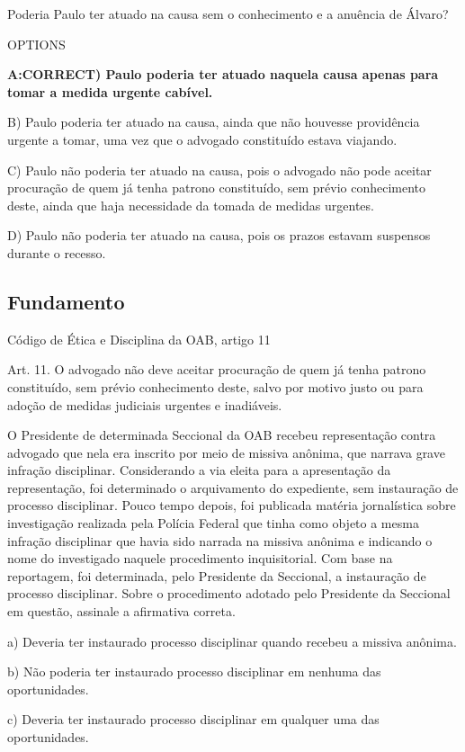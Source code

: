 \documentclass[12pt]{article}
\begin{document}
Poderia Paulo ter atuado na causa sem o conhecimento e a 
anuência de Álvaro? 

OPTIONS

\textbf{A:CORRECT) Paulo poderia ter atuado naquela causa apenas para tomar 
a medida urgente cabível.} 

B) Paulo poderia ter atuado na causa, ainda que não 
houvesse providência urgente a tomar, uma vez que o 
advogado constituído estava viajando. 

C) Paulo não poderia ter atuado na causa, pois o advogado 
não pode aceitar procuração de quem já tenha patrono 
constituído, sem prévio conhecimento deste, ainda que 
haja necessidade da tomada de medidas urgentes. 

D) Paulo não poderia ter atuado na causa, pois os prazos 
estavam suspensos durante o recesso. 

\subsection{Fundamento}

Código de Ética e Disciplina da OAB, artigo 11

Art. 11. O advogado não deve aceitar procuração de quem já tenha patrono constituído, sem prévio conhecimento deste, salvo por motivo justo ou para adoção de medidas
judiciais urgentes e inadiáveis.

O Presidente de determinada Seccional da OAB recebeu representação contra advogado que nela era inscrito por meio de missiva anônima, que narrava grave infração disciplinar. Considerando a via eleita para a apresentação da representação, foi determinado o arquivamento do expediente, sem instauração de processo disciplinar. Pouco tempo depois, foi publicada matéria jornalística sobre investigação realizada pela Polícia Federal que tinha como objeto a mesma infração disciplinar que havia sido narrada na missiva anônima e indicando o nome do investigado naquele procedimento inquisitorial. Com base na reportagem, foi determinada, pelo Presidente da Seccional, a instauração de processo disciplinar. Sobre o procedimento adotado pelo Presidente da Seccional em questão, assinale a
afirmativa correta.

a) Deveria ter instaurado processo disciplinar quando recebeu a missiva anônima.

b) Não poderia ter instaurado processo disciplinar em nenhuma das oportunidades.

c) Deveria ter instaurado processo disciplinar em qualquer uma das oportunidades.
\end{document}
